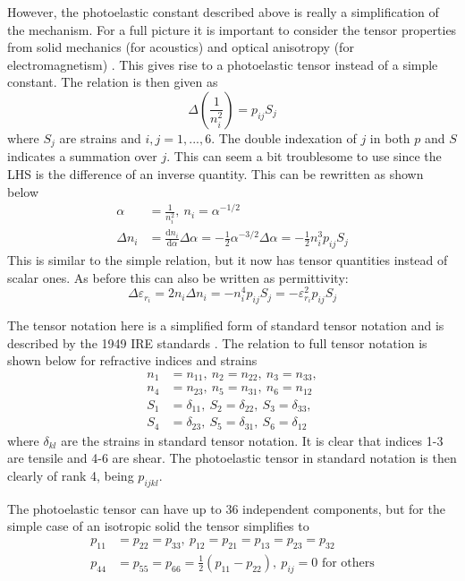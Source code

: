 \documentclass[10pt,a4paper,draft]{scrartcl}
\begin{document}
	However, the photoelastic constant described above is really a simplification of the mechanism. For a full picture it is important to consider the tensor properties from solid mechanics (for acoustics) and optical anisotropy (for electromagnetism) \cite{Korpel1988}. This gives rise to a photoelastic tensor instead of a simple constant. The relation is then given as \cite{Korpel1988}
	\begin{equation*}
	\Delta \left( \frac{1}{n_i^2} \right) = p_{ij} S_j
	\end{equation*}
	where $S_j$ are strains and $i,j = 1,...,6$. The double indexation of $j$ in both $p$ and $S$ indicates a summation over $j$. This can seem a bit troublesome to use since the LHS is the difference of an inverse quantity. This can be rewritten as shown below
	\begin{align*}
	\alpha &= \frac{1}{n_i^2},\ n_i = \alpha^{-1/2} \\
	\Delta n_i &= \frac{\mathrm{d}n_i}{\mathrm{d}\alpha} \Delta \alpha = -\frac{1}{2} \alpha^{-3/2} \Delta \alpha = -\frac{1}{2} n_i^3 p_{ij} S_j
	\end{align*}
	This is similar to the simple relation, but it now has tensor quantities instead of scalar ones. As before this can also be written as permittivity:
	\begin{equation*}
	\Delta \varepsilon_{r_i} = 2n_i\Delta n_i = -n_i^4 p_{ij} S_j = -\varepsilon_{r_i}^2 p_{ij} S_j
	\end{equation*}
	
	The tensor notation here is a simplified form of standard tensor notation and is described by the 1949 IRE standards \cite{Korpel1988}.  The relation to full tensor notation is shown below for refractive indices and strains \cite{Korpel1988}
	\begin{align*}
	n_1 &= n_{11},\ n_2 = n_{22},\ n_3 = n_{33}, \\
	n_4 &= n_{23},\ n_5 = n_{31},\ n_6 = n_{12} \\
	S_1 &= \delta_{11},\ S_2 = \delta_{22},\ S_3 = \delta_{33}, \\
	S_4 &= \delta_{23},\ S_5 = \delta_{31},\ S_6 = \delta_{12}
	\end{align*}
	where $\delta_{kl}$ are the strains in standard tensor notation. It is clear that indices 1-3 are tensile and 4-6 are shear. The photoelastic tensor in standard notation is then clearly of rank 4, being $p_{ijkl}$.
	
	The photoelastic tensor can have up to 36 independent components, but for the simple case of an isotropic solid the tensor simplifies to \cite{Korpel1988}
	\begin{align*}
	p_{11} &= p_{22} = p_{33}, \ p_{12} = p_{21} = p_{13} = p_{23} = p_{32}\\
	p_{44} &= p_{55} = p_{66} = \frac{1}{2} (p_{11} - p_{22}), \ p_{ij} = 0 \text{ for others}
	\end{align*}
	
\end{document}
